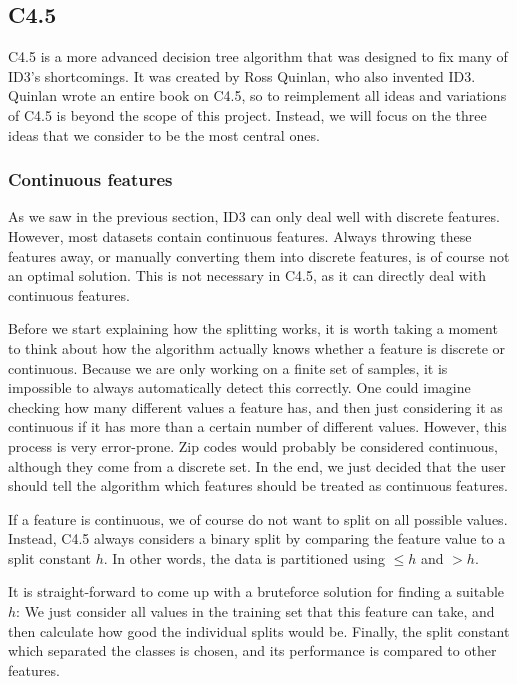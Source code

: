 \documentclass[a4paper]{article}
\begin{document}
\subsection{C4.5}
\label{subsec:c45}

C4.5 is a more advanced decision tree algorithm that was designed to fix many of ID3's shortcomings. It was created by Ross Quinlan, who also invented ID3. Quinlan wrote an entire book on C4.5, so to reimplement all ideas and variations of C4.5 is beyond the scope of this project. Instead, we will focus on the three ideas that we consider to be the most central ones.

\subsubsection{Continuous features}

As we saw in the previous section, ID3 can only deal well with discrete features. However, most datasets contain continuous features. Always throwing these features away, or manually converting them into discrete features, is of course not an optimal solution. This is not necessary in C4.5, as it can directly deal with continuous features.

Before we start explaining how the splitting works, it is worth taking a moment to think about how the algorithm actually knows whether a feature is discrete or continuous. Because we are only working on a finite set of samples, it is impossible to always automatically detect this correctly. One could imagine checking how many different values a feature has, and then just considering it as continuous if it has more than a certain number of different values. However, this process is very error-prone. Zip codes would probably be considered continuous, although they come from a discrete set. In the end, we just decided that the user should tell the algorithm which features should be treated as continuous features.

If a feature is continuous, we of course do not want to split on all possible values. Instead, C4.5 always considers a binary split by comparing the feature value to a split constant $h$. In other words, the data is partitioned using $\le h$ and $> h$.

It is straight-forward to come up with a bruteforce solution for finding a suitable $h$: We just consider all values in the training set that this feature can take, and then calculate how good the individual splits would be. Finally, the split constant which separated the classes is chosen, and its performance is compared to other features.
\end{document}
